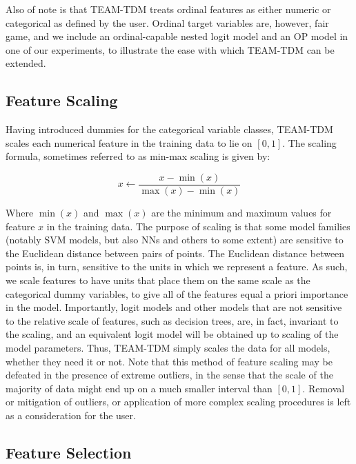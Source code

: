 \documentclass[numbered]{trbunofficial}
\begin{document}
Also of note is that TEAM-TDM treats ordinal features as either numeric or categorical as defined by the user.
 Ordinal target variables are, however, fair game, and we include an ordinal-capable nested logit model and an OP model in one of our experiments, to illustrate the ease with which TEAM-TDM can be extended.

\subsection{Feature Scaling} \label{subsection:scaling}

Having introduced dummies for the categorical variable classes, TEAM-TDM scales each numerical feature in the training data to lie on $[0,1]$.
 The scaling formula, sometimes referred to as min-max scaling is given by:

\begin{linenomath}
  \begin{equation}
x \leftarrow \frac{x - \min(x)}{\max(x) - \min(x)}
  \end{equation}
\end{linenomath}

Where $\min(x)$ and $\max(x)$ are the minimum and maximum values for feature $x$ in the training data.
 The purpose of scaling is that some model families (notably SVM models, but also NNs and others to some extent) are sensitive to the Euclidean distance between pairs of points.
 The Euclidean distance between points is, in turn, sensitive to the units in which we represent a feature.
 As such, we scale features to have units that place them on the same scale as the categorical dummy variables, to give all of the features equal a priori importance in the model.
 Importantly, logit models and other models that are not sensitive to the relative scale of features, such as decision trees, are, in fact, invariant to the scaling, and an equivalent logit model will be obtained up to scaling of the model parameters.
 Thus, TEAM-TDM simply scales the data for all models, whether they need it or not.
 Note that this method of feature scaling may be defeated in the presence of extreme outliers, in the sense that the scale of the majority of data might end up on a much smaller interval than $[0,1]$.
 Removal or mitigation of outliers, or application of more complex scaling procedures is left as a consideration for the user.

\subsection{Feature Selection} \label{subsection:selection}
\end{document}
